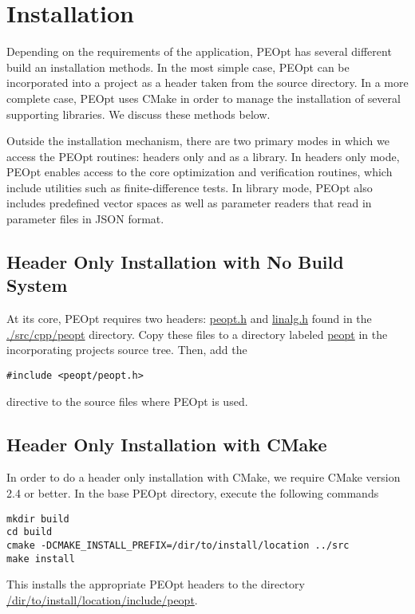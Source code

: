 \documentclass{report}
\begin{document}
\chapter{Installation}\label{ch:Install}

    Depending on the requirements of the application, PEOpt has several different build an installation methods.  In the most simple case, PEOpt can be incorporated into a project as a header taken from the source directory.  In a more complete case, PEOpt uses CMake in order to manage the installation of several supporting libraries.  We discuss these methods below.

        Outside the installation mechanism, there are two primary modes in which we access the PEOpt routines: headers only and as a library.  In headers only mode, PEOpt enables access to the core optimization and verification routines, which include utilities such as finite-difference tests.  In library mode, PEOpt also includes predefined vector spaces as well as parameter readers that read in parameter files in JSON format.

\section{Header Only Installation with No Build System}

        At its core, PEOpt requires two headers: \url{peopt.h} and \url{linalg.h} found in the \url{./src/cpp/peopt} directory.  Copy these files to a directory labeled \url{peopt} in the incorporating projects source tree.  Then, add the
\begin{verbatim}
#include <peopt/peopt.h>
\end{verbatim}
directive to the source files where PEOpt is used.


\section{Header Only Installation with CMake}

        In order to do a header only installation with CMake, we require CMake version 2.4 or better.  In the base PEOpt directory, execute the following commands
\begin{verbatim}
mkdir build
cd build
cmake -DCMAKE_INSTALL_PREFIX=/dir/to/install/location ../src
make install
\end{verbatim}
This installs the appropriate PEOpt headers to the directory \url{/dir/to/install/location/include/peopt}.
\end{document}
